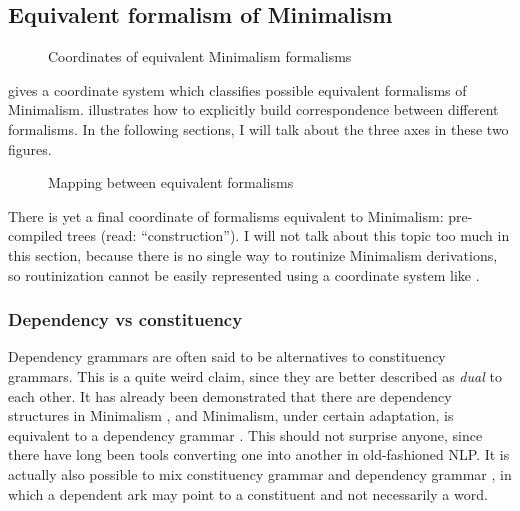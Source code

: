 \documentclass[../main.tex]{subfiles}
\begin{document}
\subsection{Equivalent formalism of Minimalism}

\begin{figure}
    \centering
    
    \caption{Coordinates of equivalent Minimalism formalisms} 
    \label{fig:coordinate-minimalism}
\end{figure}

 gives a coordinate system which classifies possible equivalent formalisms
of Minimalism.  illustrates how to explicitly build correspondence between 
different formalisms. In the following sections, I will talk about the three axes in these two figures. 

\begin{figure}
    \centering
    
    \caption{Mapping between equivalent formalisms}
    \label{fig:minimalism-mapping}
\end{figure}

There is yet a final coordinate of formalisms equivalent to Minimalism: pre-compiled trees 
(read: ``construction''). I will not talk about this topic too much in this section, because there is no 
single way to routinize Minimalism derivations, so routinization cannot be easily represented 
using a coordinate system like .

\subsubsection{Dependency vs constituency}\label{sec:minimalist-dependency}

Dependency grammars are often said to be alternatives to constituency grammars.
This is a quite weird claim, since they are better described as \emph{dual} to each other.
It has already been demonstrated that there are dependency structures in Minimalism \citep{boston2009dependency},
and Minimalism, under certain adaptation, is equivalent to a dependency grammar \citep{osborne2011bare}.
This should not surprise anyone, since there have long been tools converting one into another in old-fashioned NLP.
It is actually also possible to mix constituency grammar and dependency grammar 
\cite{kahane-mazziotta-2015-syntactic}, in which a dependent ark may point to a constituent and not necessarily a word.
\end{document}
